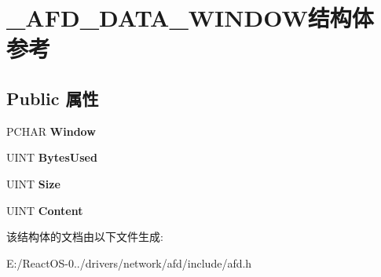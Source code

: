\hypertarget{struct___a_f_d___d_a_t_a___w_i_n_d_o_w}{}\section{\+\_\+\+A\+F\+D\+\_\+\+D\+A\+T\+A\+\_\+\+W\+I\+N\+D\+O\+W结构体 参考}
\label{struct___a_f_d___d_a_t_a___w_i_n_d_o_w}
\subsection*{Public 属性}
\begin{DoxyCompactItemize}
\item 
\mbox{\label{struct___a_f_d___d_a_t_a___w_i_n_d_o_w_a463df10cd8f23fd26e043fd68c7f8ebb}} 
P\+C\+H\+AR {\bfseries Window}
\item 
\mbox{\label{struct___a_f_d___d_a_t_a___w_i_n_d_o_w_abdbf2fd91e2167617b53948f423f8df4}} 
U\+I\+NT {\bfseries Bytes\+Used}
\item 
\mbox{\label{struct___a_f_d___d_a_t_a___w_i_n_d_o_w_a3afb97f95ec05477b188a85a2e872ddb}} 
U\+I\+NT {\bfseries Size}
\item 
\mbox{\label{struct___a_f_d___d_a_t_a___w_i_n_d_o_w_a7cb926b8a45f3eb74ffc224ad68f72d5}} 
U\+I\+NT {\bfseries Content}
\end{DoxyCompactItemize}


该结构体的文档由以下文件生成\+:\begin{DoxyCompactItemize}
\item 
E\+:/\+React\+O\+S-\/0../drivers/network/afd/include/afd.\+h\end{DoxyCompactItemize}
